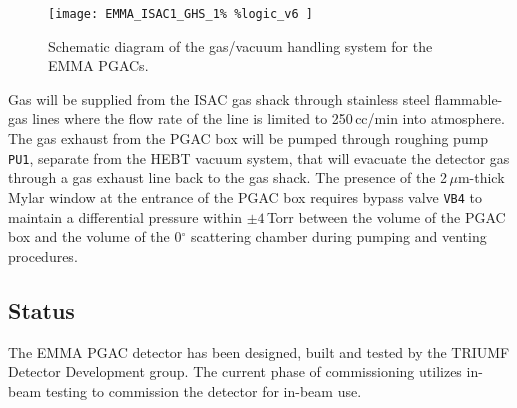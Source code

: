 
\begin{figure}[t]
\centerline{
\texttt{[image: EMMA\_ISAC1\_GHS\_1\%
\%logic\_v6
]}
}
\caption{Schematic diagram of the gas/vacuum handling system for the EMMA PGACs.
}
\label{diagram}
\end{figure}

Gas will be supplied from the ISAC gas shack through stainless steel flammable-gas lines where the
flow rate of the line is limited to 250\,cc/min into atmosphere. The gas exhaust from the
PGAC box will be pumped through roughing pump \texttt{PU1}, separate from the HEBT vacuum system, that will evacuate the detector gas through a gas exhaust line back to the gas shack.
The presence of the 2\,$\mu$m-thick Mylar window at the entrance of the PGAC box requires bypass valve \texttt{VB4}
to maintain a differential pressure within $\pm 4$\,Torr between the volume of the PGAC box and the volume of  the 0$^\circ$ scattering chamber
during pumping and venting procedures.

\subsection{Status}
\label{det_status}
The EMMA PGAC detector has been designed, built and tested by the TRIUMF Detector Development group.  The current phase of commissioning utilizes in-beam testing to commission the detector for in-beam use. %
